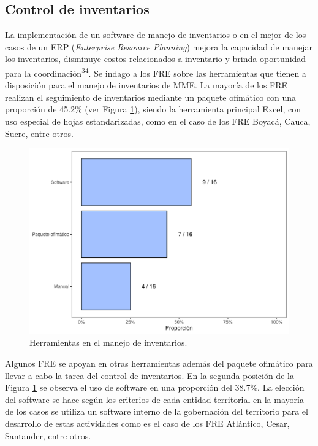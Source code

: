 \documentclass[
  oneside]{book}
\begin{document}
\hypertarget{control-de-inventarios}{%
\subsection{Control de inventarios}\label{control-de-inventarios}}

La implementación de un software de manejo de inventarios o en el mejor de los casos de un ERP (\emph{Enterprise Resource Planning}) mejora la capacidad de manejar los inventarios, disminuye costos relacionados a inventario y brinda oportunidad para la coordinación\textsuperscript{\protect\hyperlink{ref-Silver2017}{34}}. Se indago a los FRE sobre las herramientas que tienen a disposición para el manejo de inventarios de MME. La mayoría de los FRE realizan el seguimiento de inventarios mediante un paquete ofimático con una proporción de 45.2\% (ver Figura \ref{fig:HerramientasManejoInventarios}), siendo la herramienta principal Excel, con uso especial de hojas estandarizadas, como en el caso de los FRE Boyacá, Cauca, Sucre, entre otros.

\begin{figure}[t]

{\centering \includegraphics[width=0.95\linewidth]{InformeFinal_files/figure-latex/HerramientasManejoInventarios-1} 

}

\caption{Herramientas en el manejo de inventarios.}\label{fig:HerramientasManejoInventarios}
\end{figure}

Algunos FRE se apoyan en otras herramientas además del paquete ofimático para llevar a cabo la tarea del control de inventarios. En la segunda posición de la Figura \ref{fig:HerramientasManejoInventarios} se observa el uso de software en una proporción del 38.7\%. La elección del software se hace según los criterios de cada entidad territorial en la mayoría de los casos se utiliza un software interno de la gobernación del territorio para el desarrollo de estas actividades como es el caso de los FRE Atlántico, Cesar, Santander, entre otros.
\end{document}
